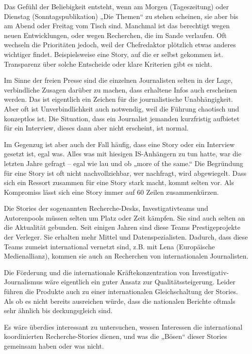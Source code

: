 Das Gefühl der Beliebigkeit entsteht, wenn am Morgen (Tageszeitung) oder
Dienstag (Sonntags­publikation) „Die Themen`` zu stehen scheinen, sie
aber bis am Abend oder Freitag vom Tisch sind. Manchmal ist das
berechtigt wegen neuen Entwicklungen, oder wegen Recherchen, die im
Sande verlaufen. Oft wechseln die Prioritäten jedoch, weil der
Chefredaktor plötzlich etwas anderes wichtiger findet. Beispielsweise
eine Story, auf die er selbst gekommen ist. Transparenz über solche
Entscheide oder klare Kriterien gibt es nicht.

Im Sinne der freien Presse sind die einzelnen Journalisten selten in der
Lage, verbindliche Zusagen darüber zu machen, dass erhaltene Infos auch
erscheinen werden. Das ist eigentlich ein Zeichen für die
journalistische Unabhängigkeit. Aber oft ist Unverbindlichkeit auch
notwendig, weil die Führung chaotisch und konzeptlos ist. Die Situation,
dass ein Journalist jemanden kurzfristig aufbietet für ein Interview,
dieses dann aber nicht erscheint, ist normal.

Im Gegenzug ist aber auch der Fall häufig, dass eine Story oder ein
Interview gesetzt ist, egal was. Alles was mit hiesigen IS-Anhängern zu
tun hatte, war die letzten Jahre gefragt -- egal wie lau und ob „more of
the same.`` Die Begründung für eine Story ist oft nicht nachvollziehbar,
wer nachfragt, wird abgewiegelt. Dass sich ein Ressort zusammen für eine
Story stark macht, kommt selten vor. Als Kompromiss lässt sich eine
Story immer auf 60 Zeilen zusammenkürzen.

Die Stories der sogenannten Recherche-Desks, Investigativteams und
Autorenpools müssen selten um Platz oder Zeit kämpfen. Sie sind auch
selten an die Aktualität gebunden. Seit einigen Jahren sind diese Teams
Prestigeprojekte der Verleger. Sie erhalten mehr Mittel und
Datenspezialisten. Dadurch, dass diese Teams zumeist international
vernetzt sind, z.B. mit Lena (Europäische Medienallianz), kommen sie
auch an Recherchen von internationalen Journalisten.

Die Förderung und die internationale Kräftekonzentration von
Investigativ-Journalismus wäre eigentlich ein guter Ansatz zur
Qualitätssteigerung. Leider führen die Produkte auch zu einer
internationalen Gleichschaltung der Stories. Als ob es nicht bereits
ausreichen würde, dass die nationalen Berichte oftmals sehr ähnlich bis
deckungsgleich sind.

Es wäre überdies interessant zu untersuchen, wessen Interessen die
international koordinierten Recherche-Stories dienen, und was die
„Bösen`` dieser Stories gemeinsam haben oder was nicht.

